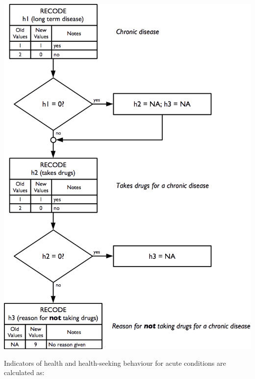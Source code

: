 \documentclass[12pt,a4paper]{book}
\theoremstyle{definition}
\theoremstyle{definition}
\theoremstyle{definition}
\theoremstyle{remark}
\begin{document}
\begin{center}\includegraphics[width=800pt]{figures/indicators21} \end{center}

Indicators of health and health-seeking behaviour for acute conditions
are calculated as:
\end{document}
